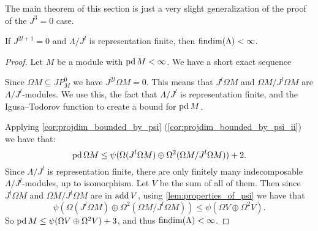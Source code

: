 The main theorem of this section is just a very slight generalization of the proof of the $J^3=0$ case. 

\begin{theorem}\cite{Wang94}\label{thm:half_rep_finite}
	If $J^{2l+1} = 0$ and $\Lambda / J^l$ is representation finite, then $\operatorname{findim}(\Lambda) < \infty$.
	\begin{proof}
		Let $M$ be a module with $\operatorname{pd} M < \infty$. We have a short exact sequence 
		\begin{center}
		\end{center}
		Since $\Omega M \subseteq JP^0_M$ we have $J^{2l}\Omega M = 0$. This means that $J^l\Omega M$ and $\Omega M / J^l\Omega M$ are $\Lambda / J^l$-modules. We use this, the fact that $\Lambda / J^l$ is representation finite, and the Igusa--Todorov function to create a bound for $\operatorname{pd} M$.
		
		Applying \cref{cor:projdim_bounded_by_psi} (\ref{cor:projdim_bounded_by_psi_ii}) we have that:
		$$ \operatorname{pd} \Omega M \leq \psi(\Omega (J^l\Omega M)\oplus\Omega^2(\Omega M / J^l\Omega M)) + 2.$$ 
		Since $\Lambda / J^l$ is representation finite, there are only finitely many indecomposable $\Lambda / J^l$-modules, up to isomorphism. Let $V$ be the sum of all of them. Then since $J^l\Omega M$ and $\Omega M / J^l\Omega M$ are in $\operatorname{add} V$, using \cref{lem:properties_of_psi} we have that 
		$$\psi(\Omega (J^l\Omega M)\oplus\Omega^2(\Omega M / J^l\Omega M)) \leq \psi(\Omega V \oplus \Omega^2 V).$$
		So $\operatorname{pd} M \leq \psi(\Omega V \oplus \Omega^2 V) + 3$, and thus $\operatorname{findim}(\Lambda) < \infty$.
	\end{proof}
\end{theorem}
